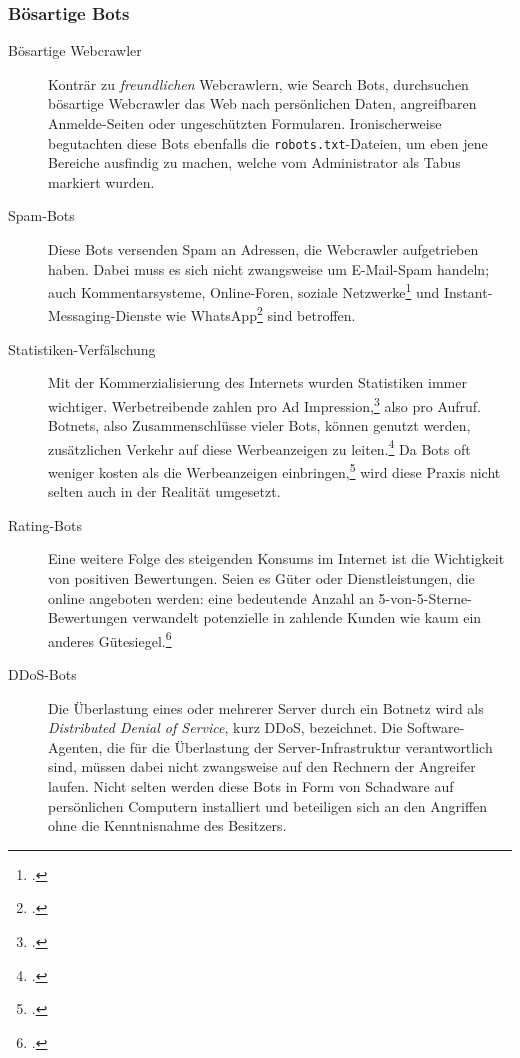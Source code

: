 \subsubsection{Bösartige Bots}
\label{ssub:boesartige-bots}

\begin{description}
  \item[Bösartige Webcrawler]
  Konträr zu \emph{freundlichen} Webcrawlern, wie Search Bots, durchsuchen
  bösartige Webcrawler das Web nach persönlichen Daten, angreifbaren
  Anmelde-Seiten oder ungeschützten Formularen. Ironischerweise begutachten
  diese Bots ebenfalls die \texttt{robots.txt}-Dateien, um eben jene Bereiche
  ausfindig zu machen, welche vom Administrator als Tabus markiert wurden.
  
  \item[Spam-Bots]
  Diese Bots versenden Spam an Adressen, die Webcrawler aufgetrieben haben.
  Dabei muss es sich nicht zwangsweise um E-Mail-Spam handeln; auch
  Kommentarsysteme, Online-Foren, soziale Netzwerke\footcite{facebookSpamBiz}
  und Instant-Messaging-Dienste wie WhatsApp\footcite{whatsappSpamSperre} sind
  betroffen.
  
  \item[Statistiken-Verfälschung]
  Mit der Kommerzialisierung des Internets wurden Statistiken immer wichtiger.
  Werbetreibende zahlen pro Ad Impression,\footcite{wp:adImpression} also pro
  Aufruf. Botnets, also Zusammenschlüsse vieler Bots, können genutzt werden,
  zusätzlichen Verkehr auf diese Werbeanzeigen zu
  leiten.\footcite{fakeTrafficPayday} Da Bots oft weniger kosten als die
  Werbeanzeigen einbringen,\footcite{fakeTrafficPayday} wird diese Praxis nicht
  selten auch in der Realität umgesetzt.
  
  \item[Rating-Bots]
  Eine weitere Folge des steigenden Konsums im Internet ist die Wichtigkeit von
  positiven Bewertungen. Seien es Güter oder Dienstleistungen, die online
  angeboten werden: eine bedeutende Anzahl an 5-von-5-Sterne-Bewertungen
  verwandelt potenzielle in zahlende Kunden wie kaum ein anderes
  Gütesiegel.\footcite{consumersInfluencedReviews}
  
  \item[DDoS-Bots]
  Die Überlastung eines oder mehrerer Server durch ein Botnetz wird als
  \emph{Distributed Denial of Service}, kurz DDoS, bezeichnet. Die
  Software-Agenten, die für die Überlastung der Server-Infrastruktur
  verantwortlich sind, müssen dabei nicht zwangsweise auf den Rechnern der
  Angreifer laufen. Nicht selten werden diese Bots in Form von Schadware auf
  persönlichen Computern installiert und beteiligen sich an den Angriffen ohne
  die Kenntnisnahme des Besitzers.
\end{description}
